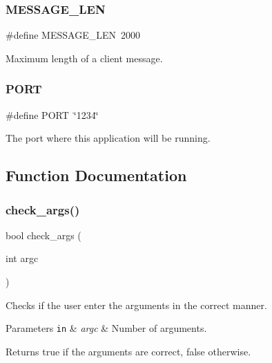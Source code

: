 \subsubsection{\texorpdfstring{M\+E\+S\+S\+A\+G\+E\+\_\+\+L\+EN}{MESSAGE\_LEN}}
{\footnotesize\ttfamily \#define M\+E\+S\+S\+A\+G\+E\+\_\+\+L\+EN~2000}



Maximum length of a client message. 

\mbox{\label{zip-zop-client_8c_a614217d263be1fb1a5f76e2ff7be19a2}} 
\subsubsection{\texorpdfstring{P\+O\+RT}{PORT}}
{\footnotesize\ttfamily \#define P\+O\+RT~\char`\"{}1234\char`\"{}}



The port where this application will be running. 



\subsection{Function Documentation}
\mbox{\label{zip-zop-client_8c_ae42aaff0193542f01451e25d0d0e6725}} 
\subsubsection{\texorpdfstring{check\+\_\+args()}{check\_args()}}
{\footnotesize\ttfamily bool check\+\_\+args (\begin{DoxyParamCaption}\item[{int}]{argc }\end{DoxyParamCaption})}



Checks if the user enter the arguments in the correct manner. 


\begin{DoxyParams}[1]{Parameters}
\mbox{\tt in}  & {\em argc} & Number of arguments.\\
\hline
\end{DoxyParams}
\begin{DoxyReturn}{Returns}
{\ttfamily true} if the arguments are correct, {\ttfamily false} otherwise. 
\end{DoxyReturn}
\mbox{\label{zip-zop-client_8c_a1c3a34b362da4351d526c8af94b228c6}} 
